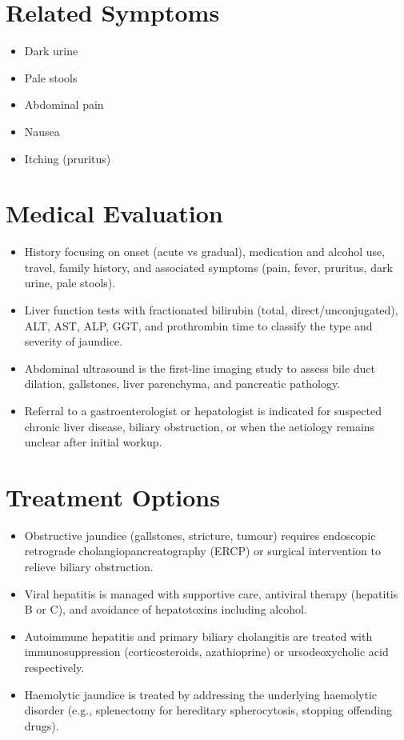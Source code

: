 \section*{Related Symptoms}
\begin{itemize}
  \item Dark urine
  \item Pale stools
  \item Abdominal pain
  \item Nausea
  \item Itching (pruritus)
\end{itemize}

\section*{Medical Evaluation}
\begin{itemize}
  \item History focusing on onset (acute vs gradual), medication and alcohol use, travel, family history, and associated symptoms (pain, fever, pruritus, dark urine, pale stools).
  \item Liver function tests with fractionated bilirubin (total, direct/unconjugated), ALT, AST, ALP, GGT, and prothrombin time to classify the type and severity of jaundice.
  \item Abdominal ultrasound is the first-line imaging study to assess bile duct dilation, gallstones, liver parenchyma, and pancreatic pathology.
  \item Referral to a gastroenterologist or hepatologist is indicated for suspected chronic liver disease, biliary obstruction, or when the aetiology remains unclear after initial workup.
\end{itemize}

\section*{Treatment Options}
\begin{itemize}
  \item Obstructive jaundice (gallstones, stricture, tumour) requires endoscopic retrograde cholangiopancreatography (ERCP) or surgical intervention to relieve biliary obstruction.
  \item Viral hepatitis is managed with supportive care, antiviral therapy (hepatitis B or C), and avoidance of hepatotoxins including alcohol.
  \item Autoimmune hepatitis and primary biliary cholangitis are treated with immunosuppression (corticosteroids, azathioprine) or ursodeoxycholic acid respectively.
  \item Haemolytic jaundice is treated by addressing the underlying haemolytic disorder (e.g., splenectomy for hereditary spherocytosis, stopping offending drugs).
\end{itemize}

